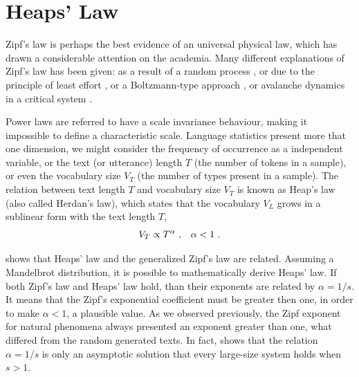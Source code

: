%





\section{Heaps' Law}
Zipf's law is perhaps the best evidence of an universal physical law, which
has drawn a considerable attention on the academia. Many different explanations
of Zipf's law has been given: as a result of a random process \citep{miller1957,li1992},
or due to the principle of least effort \citep{zipf1949, ramon2003}, or 
a Boltzmann-type approach \citep{during2008}, or avalanche dynamics in a
critical system \citep{bak1999}.

Power laws are referred to have a scale invariance behaviour, making it impossible
to define a characteristic scale. Language statistics present more that one
dimension, we might consider the frequency of occurrence as a independent variable,
or the text (or utterance) length $T$ (the number of tokens in a sample), 
or even the vocabulary size $V_T$ (the number of types present in a sample).
The relation between text length $T$ and vocabulary size $V_T$ is known as
Heap's law (also called Herdan's law), which states that the vocabulary
$V_L$ grows in a sublinear form with the text length $T$,
\begin{equation}
\label{eq:heaps}
V_T \propto T^\alpha \textmd{ , \ \ } \alpha < 1 \textmd{ .}
\end{equation}

\cite{vanLeijenhorst} shows that Heaps' law and the generalized Zipf's law are related.
Assuming a Mandelbrot distribution, it is possible to mathematically derive Heaps' law.
If both Zipf's law and Heaps' law hold, than their exponents are related by $\alpha = 1/s$.
It means that the Zipf's exponential coefficient must be greater then one, in order
to make $\alpha < 1$, a plausible value. As we observed previously, the Zipf exponent 
for natural phenomena always presented an exponent greater than one, what differed from 
the random generated texts. In fact, \cite{linyua2010} shows that the relation
$\alpha = 1/s$ is only an asymptotic solution that every large-size system holds
when $s > 1$. 

